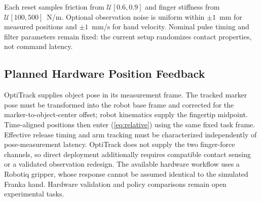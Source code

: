 \documentclass[letterpaper,10pt,conference]{ieeeconf}
\begin{document}
Each reset samples friction from $\mathcal U[0.6,0.9]$ and finger stiffness from $\mathcal U[100,500]$~N/m. Optional observation noise is uniform within $\pm1$~mm for measured positions and $\pm1$~mm/s for hand velocity. Nominal pulse timing and filter parameters remain fixed: the current setup randomizes contact properties, not command latency.

\subsection{Planned Hardware Position Feedback}
OptiTrack supplies object pose in its measurement frame. The tracked marker pose must be transformed into the robot base frame and corrected for the marker-to-object-center offset; robot kinematics supply the fingertip midpoint. Time-aligned positions then enter (\ref{eq:relative}) using the same fixed task frame. Effective release timing and arm tracking must be characterized independently of pose-measurement latency. OptiTrack does not supply the two finger-force channels, so direct deployment additionally requires compatible contact sensing or a validated observation redesign. The available hardware workflow uses a Robotiq gripper, whose response cannot be assumed identical to the simulated Franka hand. Hardware validation and policy comparisons remain open experimental tasks.

\balance


\end{document}
